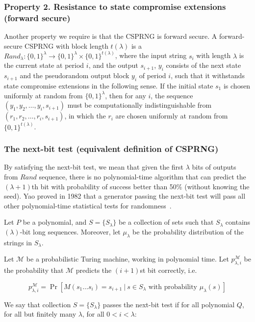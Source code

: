 \documentclass{article}
\begin{document}
\subsubsection*{Property 2. Resistance to state compromise extensions (forward secure)}
Another property we require is that the CSPRNG is forward secure. A forward-secure CSPRNG with block length $t(\lambda)$ is a $Rand_{\lambda} \colon \{0,1\}^\lambda \to \{0,1\}^\lambda \times \{0,1\}^{t(\lambda)}$, where the input string $s_i$ with length $\lambda$ is the current state at period $i$, and the output $s_{i+1}$, $y_i$ consists of the next state $s_{i+1}$ and the pseudorandom output block $y_i$ of period $i$, such that it withstands state compromise extensions in the following sense. If the initial state $s_1$ is chosen uniformly at random from $\{0,1\}^\lambda$, then for any $i$, the sequence $(y_1, y_2,\dots, y_i,s_{i+1})$ must be computationally indistinguishable from $(r_1,r_2,\dots,r_i,s_{i+1})$, in which the $r_i$ are chosen uniformly at random from $\{0,1\}^{t(\lambda)}$.

\subsubsection*{The next-bit test (equivalent definition of CSPRNG)}
By satisfying the next-bit test, we mean that given the first $\lambda$ bits of outputs from $Rand$ sequence, there is no polynomial-time algorithm that can predict the $(\lambda+1)$th bit with probability of success better than 50\% (without knowing the seed). Yao proved in 1982 that a generator passing the next-bit test will pass all other polynomial-time statistical tests for randomness~\cite{Yao1982TheoryAA}.

Let $P$ be a polynomial, and $S=\{S_\lambda\}$ be a collection of sets such that $S_\lambda$ contains $(\lambda)$-bit long sequences. Moreover, let $\mu_\lambda$ be the probability distribution of the strings in $S_\lambda$.

Let $\mathcal{M}$ be a probabilistic Turing machine, working in polynomial time. Let $p_{\lambda,i}^{\mathcal{M}}$ be the probability that $\mathcal{M}$ predicts the $(i+1)$st bit correctly, i.e.

$$p_{\lambda,i}^{\mathcal{M}}=\Pr[M(s_1\ldots s_i)=s_{i+1}\ | \ s\in S_\lambda\text{ with probability }\mu_\lambda(s)]$$

We say that collection $S = \{ S_\lambda \}$ passes the next-bit test if for all polynomial $Q$, for all but finitely many $\lambda$, for all $0 < i < \lambda$: 
\end{document}
